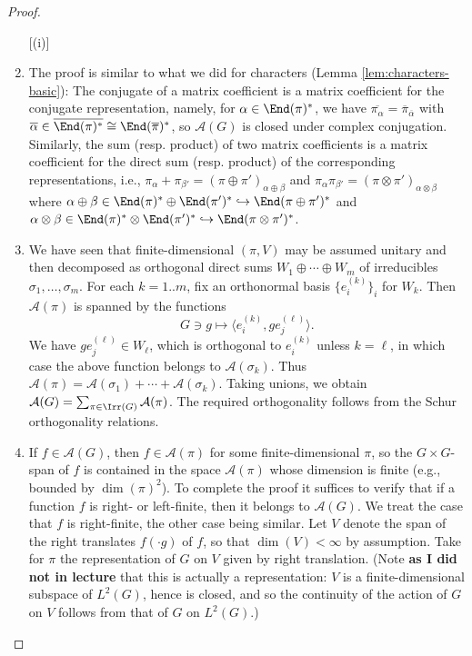 \documentclass[reqno]{amsart} 
\begin{document}
\begin{proof}
  \begin{enumerate}
[(i)]
  \item The proof is similar to what we did for characters (Lemma \ref{lem:characters-basic}): The conjugate of a matrix coefficient is a matrix coefficient for the conjugate representation, namely, for $\alpha \in \End(\pi)^*$, we have $\overline{\pi _\alpha } = \overline{\pi }_{\overline{\alpha}}$ with $\overline{\alpha } \in \overline{\End(\pi)^*} \cong \End(\overline{\pi })^*$, so $\mathcal{A}(G)$ is closed under complex conjugation.  Similarly, the sum (resp. product) of two matrix coefficients is a matrix coefficient for the direct sum (resp. product) of the corresponding representations, i.e., $\pi_{\alpha} + \pi_{\beta '} = (\pi \oplus \pi ')_{\alpha \oplus \beta}$ and $\pi_{\alpha} \pi_{\beta '} = (\pi \otimes \pi ')_{\alpha \otimes \beta}$ where $\alpha \oplus \beta \in \End(\pi)^* \oplus \End(\pi ')^* \hookrightarrow \End(\pi \oplus \pi ')^*$ and $\alpha \otimes \beta \in \End(\pi)^* \otimes \End(\pi ')^* \hookrightarrow \End(\pi \otimes \pi ')^*$.
  \item We have seen that finite-dimensional $(\pi,V)$ may be assumed unitary and then decomposed as orthogonal direct sums $W_1 \oplus \dotsb \oplus W_m$ of irreducibles $\sigma_1,\dotsc,\sigma_m$.  For each $k = 1..m$, fix an orthonormal basis $\{e_i^{(k)}\}_i$ for $W_k$.  Then $\mathcal{A}(\pi)$ is spanned by the functions
    \begin{equation*}
      G \ni g \mapsto \langle e_i^{(k)}, g e_j^{(\ell)} \rangle.
    \end{equation*}
    We have $g e_j^{(\ell)} \in W_{\ell}$, which is orthogonal to $e_i^{(k)}$ unless $k = \ell$, in which case the above function belongs to $\mathcal{A}(\sigma_k)$.  Thus $\mathcal{A}(\pi) = \mathcal{A}(\sigma_1) + \dotsb + \mathcal{A}(\sigma_k)$.  Taking unions, we obtain $\mathcal{A}(G) = \sum_{\pi \in \Irr(G)} \mathcal{A}(\pi)$.  The required orthogonality follows from the Schur orthogonality relations.
  \item If $f \in \mathcal{A}(G)$, then $f \in \mathcal{A}(\pi)$ for some finite-dimensional $\pi$, so the $G \times G$-span of $f$ is contained in the space $\mathcal{A}(\pi)$ whose dimension is finite (e.g., bounded by $\dim(\pi)^2$).  To complete the proof it suffices to verify that if a function $f$ is right- or left-finite, then it belongs to $\mathcal{A}(G)$.  We treat the case that $f$ is right-finite, the other case being similar.  Let $V$ denote the span of the right translates $f(\cdot g)$ of $f$, so that $\dim(V) < \infty$ by assumption.  Take for $\pi$ the representation of $G$ on $V$ given by right translation.  (Note {\bf as I did not in lecture} that this is actually a representation: $V$ is a finite-dimensional subspace of $L^2(G)$, hence is closed, and so the continuity of the action of $G$ on $V$ follows from that of $G$ on $L^2(G)$.)
    

\end{enumerate}
\end{proof}
\end{document}
